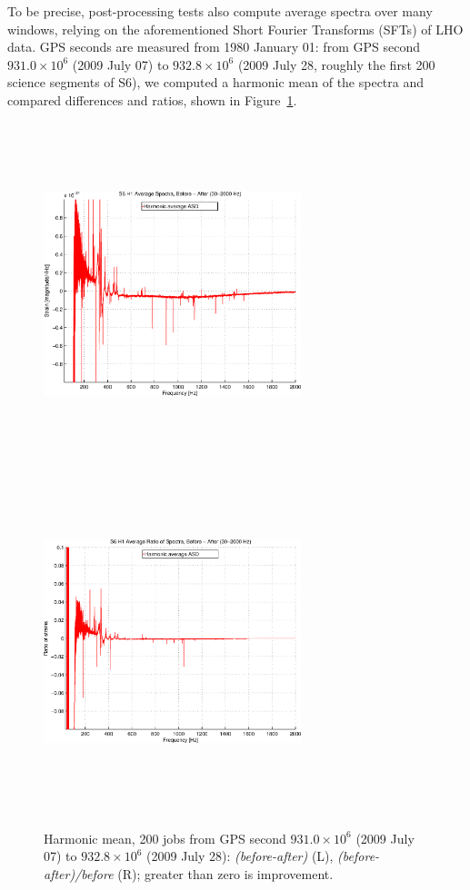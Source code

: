 To be precise, post-processing tests also compute average spectra over many windows, relying on the aforementioned Short Fourier Transforms (SFTs) of LHO data. GPS seconds are measured from 1980 January 01: from GPS second $931.0\times 10^6$ (2009 July 07) to $932.8\times 10^6$ (2009 July 28, roughly the first 200 science segments of S6), we computed a harmonic mean of the spectra and compared differences and ratios, shown in Figure~\ref{SFTgraph}.

\begin{figure}
\begin{center}
\includegraphics[height=100mm, width=75mm]{figure13a.eps}
\includegraphics[height=100mm, width=75mm]{figure13b.eps}
\caption{Harmonic mean,
200 jobs from GPS second $931.0 \times 10^6$ (2009 July 07) to $932.8\times 10^6$ (2009 July 28): \textit{(before-after)} (L), \textit{(before-after)/before} (R); greater than zero is improvement.}
\label{SFTgraph}
\end{center}
\end{figure}

